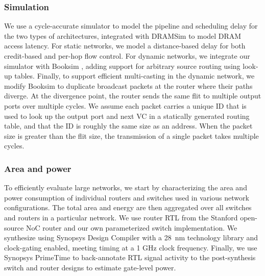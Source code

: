 \subsubsection{Simulation}
We use a cycle-accurate simulator to model the pipeline and scheduling delay for the two types of architectures,
 integrated with DRAMSim \cite{dramsim} to model DRAM access latency. For static networks, we model
a distance-based delay for both credit-based and per-hop flow control. 
For dynamic networks, we integrate
our simulator with Booksim \cite{jiang2013detailed}, adding support for arbitrary source routing using look-up tables. 
Finally, to support efficient multi-casting in the dynamic network, we modify Booksim to duplicate broadcast packets at the router where their paths diverge.
At the divergence point, the router sends the same flit to multiple output ports over multiple cycles.
We assume each packet carries a unique ID that is used to look up the output port and next VC in a statically generated routing table, and that the ID is roughly the same size as an address.
When the packet size is greater than the flit size, the transmission of a single packet takes multiple cycles.

\subsubsection{Area and power}
To efficiently evaluate large networks, we start by characterizing the area and power consumption of individual routers and switches
used in various network configurations. 
The total area and energy are then aggregated over all switches and routers in a particular network.
We use router RTL from the Stanford open-source NoC router \cite{becker2012efficient} and our own parameterized switch implementation.
We synthesize using Synopsys Design Compiler with a \SI{28}{nm} technology library and clock-gating enabled, meeting timing at a 1 GHz clock frequency.
Finally, we use Synopsys PrimeTime to back-annotate RTL signal activity to the post-synthesis switch and router designs to estimate gate-level power.

